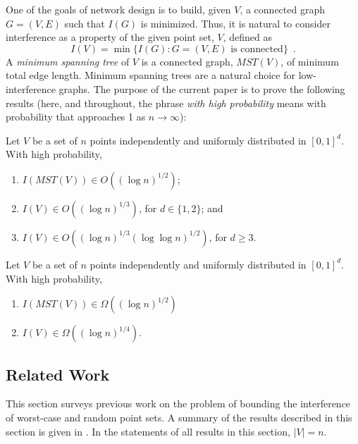 \documentclass{cccg12}
\newcommand{\mst}{\mathit{MST}}
\begin{document}
One of the goals of network design is to build, given $V$, a connected
graph $G=(V,E)$ such that $I(G)$ is minimized.  Thus, it is natural to consider interference as a property of the given point set, $V$, defined as
\[
  I(V) = \min\{I(G) : \mbox{$G=(V,E)$ is connected}\} \enspace .
\]
A \emph{minimum spanning tree} of $V$ is a connected graph, $\mst(V)$,
of minimum total edge length.  Minimum spanning trees are a natural
choice for low-interference graphs.  The purpose of the current paper
is to prove the following results (here, and throughout, the phrase
\emph{with high probability} means with probability that approaches 1
as $n\rightarrow\infty$):
\begin{thm}
  Let $V$ be a set of $n$ points independently and uniformly distributed
  in $[0,1]^d$.  With high probability,
\begin{enumerate}
  \item  $I(\mst(V))\in O((\log n)^{1/2})$;
  \item  $I(V)\in O((\log n)^{1/3})$, for $d\in\{1,2\}$; and 
  \item $I(V)\in O((\log n)^{1/3}(\log\log n)^{1/2})$, for $d\ge 3$.
\end{enumerate}
\end{thm}
\begin{thm}
  Let $V$ be a set of $n$ points independently and uniformly distributed
  in $[0,1]^d$.  With high probability, 
\begin{enumerate}
  \item $I(\mst(V))\in\Omega((\log n)^{1/2})$ 
  \item $I(V)\in \Omega((\log n)^{1/4})$.
\end{enumerate}
\end{thm}
\setcounter{thm}{3}

\subsection{Related Work}

This section surveys previous work on the problem of bounding the
interference of worst-case and random point sets.  A summary of the
results described in this section is given in .  In the
statements of all results in this section, $|V|=n$.
\end{document}
